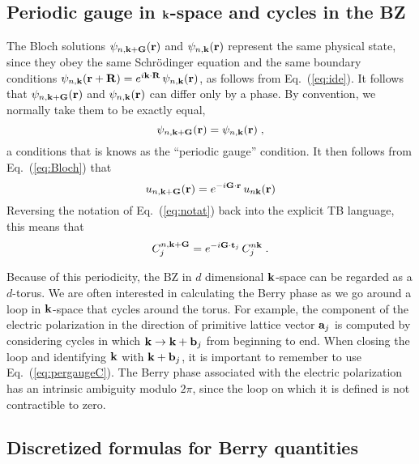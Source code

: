 \documentclass[11pt]{article}
\numberwithin{equation}{section} %
\def\beq{\begin{equation}}
\def\eeq{\end{equation}}
\newcommand{\equ}[1]{Eq.~(\ref{eq:#1})}
\def\k{{\bf k}}
\def\r{{\bf r}}
\def\R{{\bf R}}
\def\G{{\bf G}}
\def\t{{\bf t}}
\def\a{{\bf a}}
\def\b{{\bf b}}
\def\t{{\bf t}}
\begin{document}
\subsection{Periodic gauge in $\k$-space and cycles in the BZ}
\label{sec:periodic}

The Bloch solutions $\psi_{n,\k+\G}(\r)$ and $\psi_{n,\k}(\r)$
represent the same physical state, since they obey the same
Schr\"odinger equation and the same boundary conditions
$\psi_{n,\k}(\r+\R)=e^{i\k\cdot\R}\,\psi_{n,\k}(\r)$,
as follows from \equ{ide}.  It follows that $\psi_{n,\k+\G}(\r)$
and $\psi_{n,\k}(\r)$ can differ only by a phase.  By convention,
we normally take them to be exactly equal,
%
\beq
\psi_{n,\k+\G}(\r)=\psi_{n,\k}(\r) \;,
\label{eq:pergauge}
\eeq
%
a conditions that is
knows as the ``periodic gauge'' condition.  It then follows from
\equ{Bloch} that
%
\beq
u_{n,\k+\G}(\r)=e^{-i\G\cdot\r}\,u_{n\k}(\r)
\label{eq:pergaugeu}
\eeq
%
Reversing the notation of \equ{notat} back into the explicit TB
language, this means that
%
\beq
C^{n,\k+\G}_j=e^{-i\G\cdot\t_j}\,C^{n\k}_j \;.
\label{eq:pergaugeC}
\eeq

Because of this periodicity, the BZ in $d$ dimensional $\k$-space
can be regarded as a $d$-torus.
We are often interested in calculating the Berry phase
as we go around a loop in $\k$-space that cycles around the
torus.  For example, the component of the electric polarization
in the direction of primitive lattice vector $\a_j$ is computed
by considering cycles in which $\k \rightarrow \k+\b_j$ from
beginning to end.  When closing the loop and identifying
$\k$ with $\k+\b_j$, it is important to remember to use
\equ{pergaugeC}.  The Berry phase associated with the electric
polarization has an intrinsic ambiguity modulo $2\pi$, since
the loop on which it is defined is not contractible to zero.

\subsection{Discretized formulas for Berry quantities}
\end{document}
